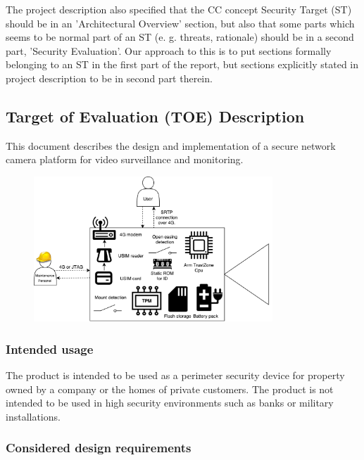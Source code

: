 \documentclass[10pt]{article}
\begin{document}
	{ \footnotesize The project description also specified that the CC concept Security Target (ST)
	should be in an 'Architectural Overview' section, but also that some parts
	which seems to be normal part of an ST (e. g. threats, rationale) \cite{stwiki} should be in a
	second part, 'Security Evaluation'. Our approach to this is to put sections formally
	belonging to an ST in the first part of the report, but sections explicitly stated in project description
	to be in second part therein. }

    \subsection{Target of Evaluation (TOE) Description}

      This document describes the design and implementation of a secure network
      camera platform for video surveillance and monitoring.

      \begin{figure}[!h]
        \center
        \includegraphics[width=0.8\textwidth]{input/platform.pdf}
      \end{figure}

      \subsubsection{Intended usage}

        The product is intended to be used as a perimeter security device for
        property owned by a company or the homes of private customers. The
        product is not intended to be used in high security environments such
        as banks or military installations.

      \subsubsection{Considered design requirements}
\end{document}
